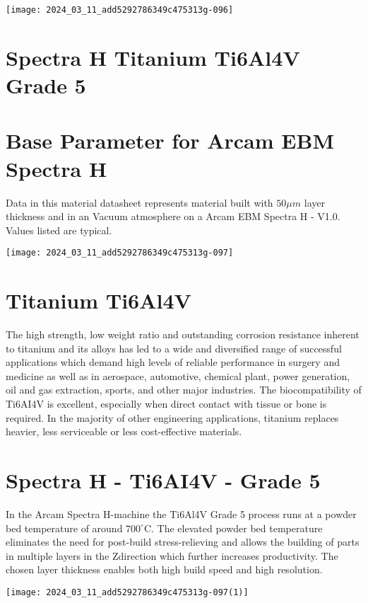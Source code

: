 \documentclass[10pt]{article}
\begin{document}
\begin{center}
\texttt{[image: 2024\_03\_11\_add5292786349c475313g-096]}
\end{center}

\section*{Spectra H Titanium Ti6Al4V Grade 5}
\section*{Base Parameter for Arcam EBM Spectra H}
Data in this material datasheet represents material built with $50 \mu m$ layer thickness and in an Vacuum atmosphere on a Arcam EBM Spectra H - V1.0. Values listed are typical.

\begin{center}
\texttt{[image: 2024\_03\_11\_add5292786349c475313g-097]}
\end{center}

\section*{Titanium Ti6Al4V}
The high strength, low weight ratio and outstanding corrosion resistance inherent to titanium and its alloys has led to a wide and diversified range of successful applications which demand high levels of reliable performance in surgery and medicine as well as in aerospace, automotive, chemical plant, power generation, oil and gas extraction, sports, and other major industries. The biocompatibility of Ti6AI4V is excellent, especially when direct contact with tissue or bone is required. In the majority of other engineering applications, titanium replaces heavier, less serviceable or less cost-effective materials.

\section*{Spectra H - Ti6AI4V - Grade 5}
In the Arcam Spectra H-machine the Ti6Al4V Grade 5 process runs at a powder bed temperature of around $700^{\circ} \mathrm{C}$. The elevated powder bed temperature eliminates the need for post-build stress-relieving and allows the building of parts in multiple layers in the Zdirection which further increases productivity. The chosen layer thickness enables both high build speed and high resolution.

\begin{center}
\texttt{[image: 2024\_03\_11\_add5292786349c475313g-097(1)]}
\end{center}
\end{document}

